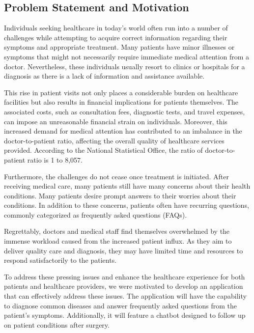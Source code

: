 \documentclass[12pt,oneside,openright,a4paper]{cpe-english-project}
\begin{document}
    \subsection{Problem Statement and Motivation}
      \qquad Individuals seeking healthcare in today's world often run into a number of challenges while attempting to acquire correct information regarding their symptoms and appropriate treatment. Many patients have minor illnesses or symptoms that might not necessarily require immediate medical attention from a doctor. Nevertheless, these individuals usually resort to clinics or hospitals for a diagnosis as there is a lack of information and assistance available. \par
      \qquad This rise in patient visits not only places a considerable burden on healthcare facilities but also results in financial implications for patients themselves. The associated costs, such as consultation fees, diagnostic tests, and travel expenses, can impose an unreasonable financial strain on individuals. Moreover, this increased demand for medical attention has contributed to an imbalance in the doctor-to-patient ratio, affecting the overall quality of healthcare services provided. According to the National Statistical Office, the ratio of doctor-to-patient ratio is 1 to 8,057.\par
      \qquad Furthermore, the challenges do not cease once treatment is initiated. After receiving medical care, many patients still have many concerns about their health conditions. Many patients desire prompt answers to their worries about their conditions. In addition to these concerns, patients often have recurring questions, commonly categorized as frequently asked questions (FAQs).\par
      \qquad Regrettably, doctors and medical staff find themselves overwhelmed by the immense workload caused from the increased patient influx. As they aim to deliver quality care and diagnosis, they may have limited time and resources to respond satisfactorily to the patients.\par
      \qquad To address these pressing issues and enhance the healthcare experience for both patients and healthcare providers, we were motivated to develop an application that can effectively address these issues. The application will have the capability to diagnose common diseases and answer frequently asked questions from the patient's symptoms. Additionally, it will feature a chatbot designed to follow up on patient conditions after surgery.\par
\end{document}
